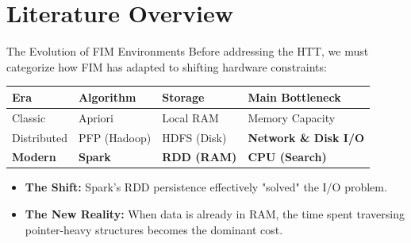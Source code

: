 \section{Literature Overview}

\begin{frame}[t]{The Evolution of FIM Environments}
    \vspace{0.2cm}
    Before addressing the HTT, we must categorize how FIM has adapted to shifting hardware constraints:
    
    \vspace{0.4cm}
    \renewcommand{\arraystretch}{1.3}
    \centering
    \begin{tabularx}{\textwidth}{l l l >{\raggedright\arraybackslash}X}
        \rowcolor{SecondaryColor!20}
        \textbf{Era} & \textbf{Algorithm} & \textbf{Storage} & \textbf{Main Bottleneck} \\ \hline
        Classic & Apriori & Local RAM & Memory Capacity \\
        Distributed & PFP (Hadoop) & HDFS (Disk) & \textbf{Network \& Disk I/O} \\
        \textbf{Modern} & \textbf{Spark} & \textbf{RDD (RAM)} & \textbf{CPU (Search)} \\ \hline
    \end{tabularx}

    \vspace{0.6cm}
    \begin{itemize}
        \item \textbf{The Shift:} Spark's RDD persistence effectively "solved" the I/O problem.
        \item \textbf{The New Reality:} When data is already in RAM, the time spent traversing pointer-heavy structures becomes the dominant cost.
    \end{itemize}
\end{frame}


